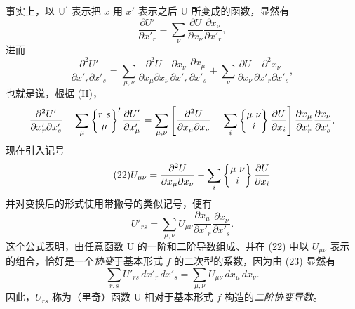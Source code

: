 事实上，以 U\(^{\prime}\) 表示把 \(x\) 用 \(x'\) 表示之后 U 所变成的函数，显然有
\[
\frac{\partial U'}{\partial x'_r}=\sum_\nu\frac{\partial U}{\partial x_\nu}\frac{\partial x_\nu}{\partial x'_r},
\]
进而
\[
\frac{\partial^2U'}{\partial x'_r\partial x'_s}=\sum_{\mu,\nu}\frac{\partial^2U}{\partial x_\mu\partial x_\nu}\frac{\partial x_\nu}{\partial x'_r}\frac{\partial x_\mu}{\partial x'_s}
+\sum_\nu\frac{\partial U}{\partial x_\nu}\frac{\partial^2x_\nu}{\partial x'_r\partial x'_s},
\]
也就是说，根据 (II)，
\[
\frac{\partial^2U'}{\partial x'_r\partial x'_s}-\sum_\mu\left\{\begin{matrix}r\ s\\ \mu\end{matrix}\right\}'\frac{\partial U'}{\partial x'_\mu}
=\sum_{\mu,\nu}\left[\frac{\partial^2U}{\partial x_\mu\partial x_\nu}-\sum_i\left\{\begin{matrix}\mu\ \nu\\ i\end{matrix}\right\}\frac{\partial U}{\partial x_i}\right]
\frac{\partial x_\mu}{\partial x'_r}\frac{\partial x_\nu}{\partial x'_s}.
\]
现在引入记号
\begin{equation}\tag{22}
U_{\mu\nu}=\frac{\partial^2U}{\partial x_\mu\partial x_\nu}-\sum_i\left\{\begin{matrix}\mu\ \nu\\ i\end{matrix}\right\}\frac{\partial U}{\partial x_i}
\end{equation}
并对变换后的形式使用带撇号的类似记号，便有
\begin{equation}\tag{23}
U'_{rs}=\sum_{\mu,\nu}U_{\mu\nu}\frac{\partial x_\mu}{\partial x'_r}\frac{\partial x_\nu}{\partial x'_s}.
\end{equation}
这个公式表明，由任意函数 U 的一阶和二阶导数组成、并在 (22) 中以 \(U_{\mu\nu}\) 表示的组合，恰好是一个\emph{协变}于基本形式 \(f\) 的二次型的系数，因为由 (23) 显然有
\[
\sum_{r,s}U'_{rs}\,dx'_r\,dx'_s=\sum_{\mu,\nu}U_{\mu\nu}\,dx_\mu\,dx_\nu.
\]
因此，\(U_{rs}\) 称为（里奇）函数 U 相对于基本形式 \(f\) 构造的\emph{二阶协变导数}。

